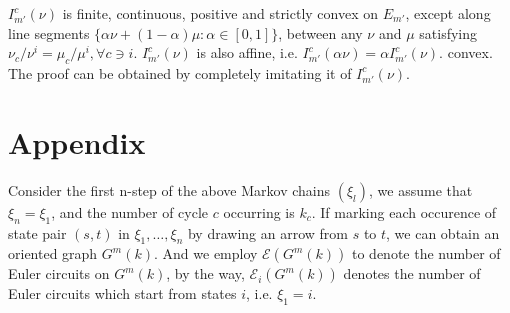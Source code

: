\documentclass[11pt,en,cite=authoryear]{elegantpaper}
\begin{document}
\begin{corollary}
    $I_{m'}^{c}(\nu)$ is  finite, continuous, positive and strictly convex on $E_{m'}$, except along line segments $\{\alpha \nu + (1-\alpha) \mu: \alpha \in [0,1]\}$, between any $\nu$ and $\mu$ satisfying $\nu_c/\nu^i = \mu_c/\mu^i, \forall c \ni i$. $I_{m'}^{c}(\nu)$ is also affine, i.e. $I_{m'}^{c}(\alpha \nu) = \alpha I_{m'}^{c}(\nu)$. convex. The proof can be obtained by completely imitating it of $I_{m'}^{c}(\nu)$.
\end{corollary}

\section{Appendix}
Consider the first n-step of the above Markov chains $(\xi_l)$, we assume that $\xi_{n}=\xi_1$, and the number of cycle $c$ occurring is $k_{c}$.
If marking each occurence of state pair $(s, t)$ in $\xi_1, \dots, \xi_n$ by drawing an arrow from $s$ to $t$, we can obtain an oriented graph $G^m(k)$. And we employ $\mathcal{E} (G^m(k))$ to denote the number of Euler circuits on $G^m(k)$, by the way, $\mathcal{E}_i (G^m(k))$ denotes the number of Euler circuits which start from states $i$, i.e. $\xi_1 = i$.
\end{document}
